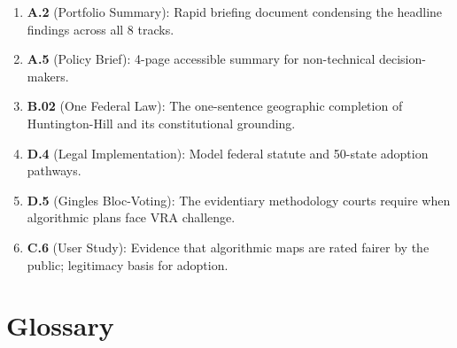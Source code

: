 \documentclass[12pt]{article}
\begin{document}
\begin{enumerate}[leftmargin=*,noitemsep,topsep=2pt]
    \item \textbf{A.2} (Portfolio Summary): Rapid briefing document condensing
        the headline findings across all 8 tracks.

    \item \textbf{A.5} (Policy Brief): 4-page accessible summary for
        non-technical decision-makers.

    \item \textbf{B.02} (One Federal Law): The one-sentence geographic
        completion of Huntington-Hill and its constitutional grounding.

    \item \textbf{D.4} (Legal Implementation): Model federal statute and
        50-state adoption pathways.

    \item \textbf{D.5} (Gingles Bloc-Voting): The evidentiary methodology
        courts require when algorithmic plans face VRA challenge.

    \item \textbf{C.6} (User Study): Evidence that algorithmic maps are rated
        fairer by the public; legitimacy basis for adoption.
\end{enumerate}


\section{Glossary}
\end{document}
